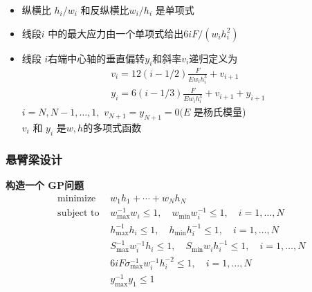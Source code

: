 \documentclass[handout]{beamer}
\begin{document}
\begin{frame}
\begin{frame}
\begin{itemize}[<+->]
			\item 纵横比 $h_{i} / w_{i}$ 和反纵横比$w_{i} / h_{i}$ 是单项式
			
			\item 线段$i$ 中的最大应力由一个单项式给出$6 i F /\left(w_{i} h_{i}^{2}\right)$ 
			
			\item 线段 $i$右端中心轴的垂直偏转$y_{i}$和斜率$v_{i}$递归定义为
			\begin{equation}
				\begin{array}{l}
					v_{i}=12(i-1 / 2) \frac{F}{E w_{i} h_{i}^{3}}+v_{i+1} \\
					y_{i}=6(i-1 / 3) \frac{F}{E w_{i} h_{i}^{3}}+v_{i+1}+y_{i+1}
				\end{array}
			\end{equation}
			$i=N, N-1, \ldots, 1,$  $v_{N+1}=y_{N+1}=0(E$ 是杨氏模量)\\
			$v_{i}$ 和 $y_{i}$ 是$w, h$的多项式函数  
		\end{itemize}
	\end{frame}
	\begin{frame}
		\frametitle{悬臂梁设计}
		\textbf{构造一个 GP问题}
		\begin{equation}
			\begin{array}{ll}
				\text { minimize } & w_{1} h_{1}+\cdots+w_{N} h_{N} \\
				\text { subject to } & w_{\max }^{-1} w_{i} \leq 1, \quad w_{\min } w_{i}^{-1} \leq 1, \quad i=1, \ldots, N \\
				& h_{\max }^{-1} h_{i} \leq 1, \quad h_{\min } h_{i}^{-1} \leq 1, \quad i=1, \ldots, N \\
				& S_{\max }^{-1} w_{i}^{-1} h_{i} \leq 1, \quad S_{\min } w_{i} h_{i}^{-1} \leq 1, \quad i=1, \ldots, N \\
				& 6 i F \sigma_{\max }^{-1} w_{i}^{-1} h_{i}^{-2} \leq 1, \quad i=1, \ldots, N \\
				& y_{\max }^{-1} y_{1} \leq 1
			\end{array}
		\end{equation}\\
		

\end{frame}
\end{frame}
\end{document}
